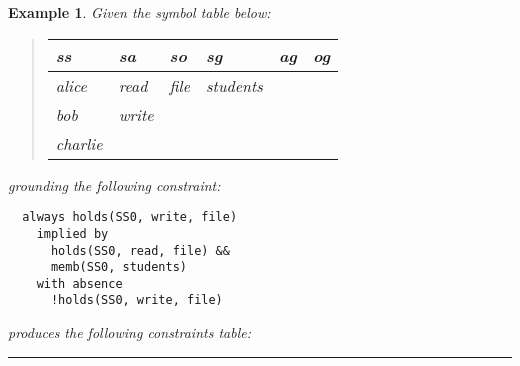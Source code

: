 \documentclass[10pt, twocolumn]{article}
\newtheorem{examp}{Example}
\newenvironment{example}{\begin{examp}\rm}{\rule{2mm}{2mm}\end{examp}}
\begin{document}
        \begin{example}
          Given the symbol table below:

          \begin{quote}
            \begin{tabular}[t]{|l|l|l|l|l|l|}
              \hline
              \textbf{ss} & \textbf{sa} & \textbf{so} & \textbf{sg} & \textbf{ag} & \textbf{og} \\
              \hline
              alice & read & file & students & & \\
              bob & write & & & & \\
              charlie & & & & & \\
              \hline
            \end{tabular}
          \end{quote}

          grounding the following constraint:

          \begin{verbatim}
  always holds(SS0, write, file)
    implied by
      holds(SS0, read, file) &&
      memb(SS0, students)
    with absence
      !holds(SS0, write, file)
          \end{verbatim}

          produces the following constraints table:


\end{example}
\end{document}

